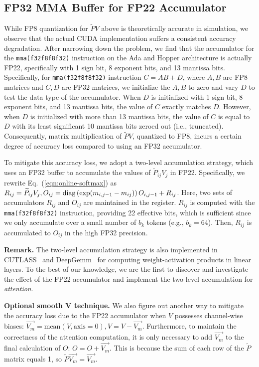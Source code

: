 \subsection{FP32 MMA Buffer for FP22 Accumulator}
While FP8 quantization for $\tilde PV$ above is theoretically accurate in simulation, we observe that the actual CUDA implementation suffers a consistent accuracy degradation. After narrowing down the problem, we find that the accumulator for the \texttt{mma(f32f8f8f32)} instruction on the Ada and Hopper architecture is actually FP22, specifically with 1 sign bit, 8 exponent bits, and 13 mantissa bits. Specifically, for \texttt{mma(f32f8f8f32)} instruction $C = AB + D$, where $A, B$ are FP8 matrices and $C, D$ are FP32 matrices, we initialize the $A, B$ to zero and vary $D$ to test the data type of the accumulator. 
When $D$ is initialized with 1 sign bit, 8 exponent bits, and 13 mantissa bits, the value of $C$ exactly matches $D$. However, when $D$ is initialized with more than 13 mantissa bits, the value of $C$ is equal to $D$ with its least significant 10 mantissa bits zeroed out (i.e., truncated).
Consequently, matrix multiplication of $\widetilde 
PV$, quantized to FP8, incurs a certain degree of accuracy loss compared to using an FP32 accumulator. 

To mitigate this accuracy loss, we adopt a two-level accumulation strategy, which uses an FP32 buffer to accumulate the values of $\widetilde{P}_{ij} V_j$ in FP22. Specifically, we rewrite Eq.~(\ref{eqn:online-softmax}) as 
$
R_{ij} = \widetilde P_{ij} V_j,O_{ij}=\mathrm{diag}\left(\exp(m_{i,j-1}-m_{ij})\right) O_{i,j-1} + R_{ij} 
$. Here, two sets of accumulators $R_{ij}$ and $O_{ij}$ are maintained in the register. $R_{ij}$ is computed with the \texttt{mma(f32f8f8f32)} instruction, providing 22 effective bits, which is sufficient since we only accumulate over a small number of $b_k$ tokens (e.g., $b_k=64$). Then, $R_{ij}$ is accumulated to $O_{ij}$ in the high FP32 precision.

\textbf{Remark.} 
The two-level accumulation strategy is also implemented in CUTLASS~\cite{cutlass} and DeepGemm~\cite{deepseekai2024deepseekv3technicalreport} for computing weight-activation products in linear layers. To the best of our knowledge, we are the first to discover and investigate the effect of the FP22 accumulator and implement the two-level accumulation for \emph{attention}.








\textbf{Optional smooth V technique.}  
We also figure out another way to mitigate the accuracy loss due to the FP22 accumulator when $V$ possesses channel-wise biases: $\overrightarrow{V_m} = \mathrm{mean}(V, \text{axis}=0), V = V - \overrightarrow{V_m}$.
Furthermore, to maintain the correctness of the attention computation, it is only necessary to add $\overrightarrow{V_m}$ to the final calculation of $O$: $O = O + \overrightarrow{V_m}$. This is because the sum of each row of the $\widetilde P$ matrix equals 1, so $\widetilde P\overrightarrow{V_m} = \overrightarrow{V_m}$.





